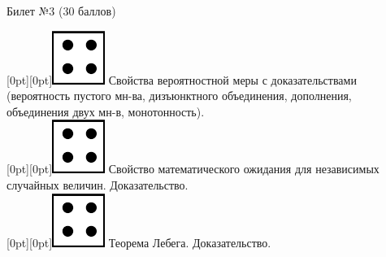 \documentclass[10pt]{article}
\begin{document}
\thispagestyle{empty}

\topskip=0pt

\vspace*{\fill}

\begin{center} {\Large Билет №3 (30 баллов)} \end{center}

\raisebox{-1pt}[0pt][0pt]{\includegraphics[width=0.02\linewidth]{4.png}} Свойства вероятностной меры с доказательствами (вероятность пустого мн-ва, дизъюнктного объединения, дополнения, объединения двух мн-в, монотонность). \\

\raisebox{-1pt}[0pt][0pt]{\includegraphics[width=0.02\linewidth]{4.png}} Свойство  математического ожидания для независимых случайных величин. Доказательство. \\

\raisebox{-1pt}[0pt][0pt]{\includegraphics[width=0.02\linewidth]{4.png}} Теорема Лебега. Доказательство. \\









\vspace*{\fill}
\end{document}
